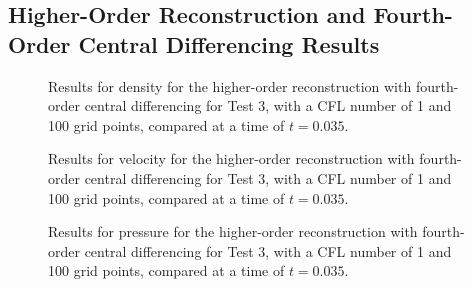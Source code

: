 \subsection{Higher-Order Reconstruction and Fourth-Order Central Differencing Results}
\begin{figure}
	\caption[Results for density for the higher-order reconstruction with fourth-order central differencing for Test 3, with a CFL number of 1 and 100 grid points, compared at a time of $t=0.035$.]{Results for density for the higher-order reconstruction with fourth-order central differencing for Test 3, with a CFL number of 1 and 100 grid points, compared at a time of $t=0.035$.}
	\label{fig:Test4HORCD4density}
\end{figure}

\begin{figure}
	\caption[Results for velocity for the higher-order reconstruction with fourth-order central differencing for Test 3, with a CFL number of 1 and 100 grid points, compared at a time of $t=0.035$.]{Results for velocity for the higher-order reconstruction with fourth-order central differencing for Test 3, with a CFL number of 1 and 100 grid points, compared at a time of $t=0.035$.}
	\label{fig:Test4HORCD4velocity}
\end{figure}

\begin{figure}
	\caption[Results for pressure for the higher-order reconstruction with fourth-order central differencing for Test 3, with a CFL number of 1 and 100 grid points, compared at a time of $t=0.035$.]{Results for pressure for the higher-order reconstruction with fourth-order central differencing for Test 3, with a CFL number of 1 and 100 grid points, compared at a time of $t=0.035$.}
	\label{fig:Test4HORCD4pressure}
\end{figure}

